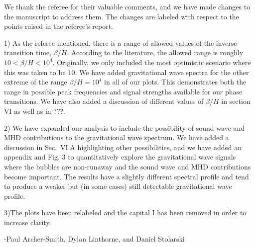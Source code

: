 \documentclass[12pt,letterpaper]{article}
\begin{document}
We thank the referee for their valuable comments, and we have made changes to the manuscript to address them. The changes are labeled with respect to the points raised in the referee's report.

1) As the referee mentioned, there is a range of allowed values of the inverse transition time, $\beta/H$. According to the literature, the allowed range is roughly $10 < \beta/H < 10^4$. Originally, we only included the most optimistic scenario where this was taken to be $10$. We have added gravitational wave spectra for the other extreme of the range $\beta/H = 10^4$ in all of our plots. This demonstrates both the range in possible peak frequencies and signal strengths available for our phase transitions. We have also added a discussion of different values of $\beta/H$ in section VI as well as in ???.

2) We have expanded our analysis to include the possibility of sound wave and MHD contributions to the gravitational wave spectrum. We have added a discussion in Sec.~VI.A highlighting other possibilities, and we have added an appendix and Fig. 3 to quantitatively explore the gravitational wave signals where the bubbles are non-runaway and the sound wave and MHD contributions become important.  The results have a slightly different spectral profile and tend to produce a weaker but (in some cases) still detectable gravitational wave profile.

3)The plots have been relabeled and the capital I has been removed in order to increase clarity.

-Paul Archer-Smith, Dylan Linthorne, and Daniel Stolarski
\end{document}
